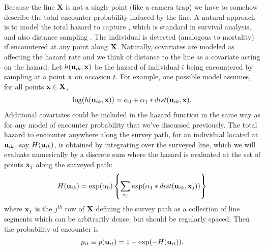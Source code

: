 Because the line {\bf X} is not a single point (like a camera trap) we
have to somehow describe the total encounter probability induced by
the line. A natural approach is to model the total hazard to capture
\citep{borchers_efford:2008}, which is standard in survival analysis,
and also distance sampling \citep{hayes_buckland:1983,
  skaug_schweder:1999}.  The individual is detected (analogous to
mortality) 
if encountered at any point along ${\bf X}$. Naturally,
covariates are modeled as affecting the hazard rate and we think of
distance to the line as a covariate acting on the hazard. Let $h({\bf
  u}_{ik},{\bf x})$ be the hazard of individual $i$ being encountered
by sampling at a point ${\bf x}$ on occasion $t$.  For example, one
possible model assumes, for all points ${\bf x} \in {\bf X}$,
\begin{equation}
\log(h({\bf u}_{ik},{\bf x})) = \alpha_{0} + \alpha_{1}*dist({\bf u}_{ik},{\bf x}).
\label{eq.hazard}
\end{equation}
Additional covariates could be included in the hazard function in the
same way as for any model of encounter probability that we've
discussed previously.  The total hazard to encounter anywhere along
the survey path, for an individual located at ${\bf u}_{ik}$, say
$H({\bf u}_{ik})$, is obtained by integrating over the surveyed line,
which we will evaluate numerically by a discrete sum where the hazard
is evaluated at the set of points ${\bf x}_{j}$ along the surveyed
path:
\begin{equation}
H({\bf u}_{ik}) =  \exp(\alpha_{0}) \left\{ \sum_{x_{j}}  \exp(\alpha_{1}*dist({\bf
    u}_{ik},{\bf x}_{j})) \right\}
\label{eq.totalhazard}
\end{equation}
where ${\bf x}_{j}$ is the $j^{th}$ row of ${\bf X}$ defining the
survey path as a collection of line segments which can be arbitrarily
dense, but should be regularly spaced.  Then the probability of
encounter 
is
\begin{equation}
p_{it} \equiv p({\bf u}_{it}) = 1- \exp(-H({\bf u}_{it})).
\label{search-encounter.eq.encounterprob}
\end{equation}

